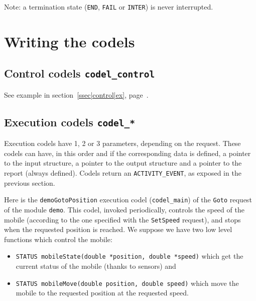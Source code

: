 Note: a termination state (\texttt{END}, \texttt{FAIL} or \texttt{INTER}) is never
interrupted.



\section{Writing the codels}
\label{sec|codels|writing}


\subsection{Control codels  \texttt{codel\_control}}

See        example            in           section~\ref{ssec|control|ex},
page~\pageref{ssec|control|ex}.

\subsection{Execution codels  \texttt{codel\_*}}

Execution  codels have 1,  2 or 3  parameters,  depending on the request.
These codels can have,  in this order and   if the corresponding  data is
defined,  a pointer to  the   input structure,  a pointer  to  the output
structure and a pointer to the report (always  defined). Codels return an
\texttt{ACTIVITY\_EVENT}, as exposed in the previous section.

Here is the \texttt{demoGotoPosition}  execution codel (\texttt{codel\_main})
of the \texttt{Goto} request of the module \texttt{demo}. This codel,
invoked periodically, controls the speed of the mobile (according to the
one specified with the \texttt{SetSpeed} request), and stops when the
requested position is reached. We suppose we have two low level functions
which control the mobile:

\begin{itemize}
\item \texttt{STATUS mobileState(double *position, double *speed)} which get
the current status of the mobile (thanks to sensors) and
\item \texttt{STATUS mobileMove(double position, double speed)} which move
the mobile to the requested position at the requested speed.
\end{itemize}


